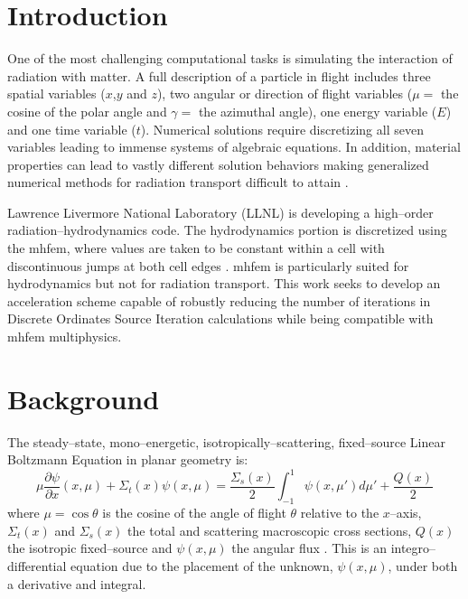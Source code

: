 \documentclass[11 pt]{article}
\newcommand{\pderiv}[2]{\frac{\partial #1}{\partial #2}}
\begin{document}



\section{Introduction}
	One of the most challenging computational tasks is simulating the interaction of radiation with matter. 
	A full description of a particle in flight includes three spatial variables ($x$,$y$ and $z$), two angular or direction of flight variables ($\mu =$ the cosine of the polar angle and $\gamma =$ the azimuthal angle), one energy variable ($E$) and one time variable ($t$). Numerical solutions require discretizing all seven variables leading to immense systems of algebraic equations. In addition, material properties can lead to vastly different solution behaviors making generalized numerical methods for radiation transport difficult to attain \cite{adams}. 



	Lawrence Livermore National Laboratory (LLNL) is developing a high--order radiation--hydrodynamics code. The hydrodynamics portion is discretized using the \gls{mhfem}, where values are taken to be constant within a cell with discontinuous jumps at both cell edges \cite{mhfem}. \gls{mhfem} is particularly suited for hydrodynamics but not for radiation transport. This work seeks to develop an acceleration scheme capable of robustly reducing the number of iterations in Discrete Ordinates Source Iteration calculations while being compatible with \gls{mhfem} multiphysics.   

\section{Background}
	The steady--state, mono--energetic, isotropically--scattering, fixed--source Linear Boltzmann Equation in planar geometry is: 
		\begin{equation} \label{eq:bte}
			\mu \pderiv{\psi}{x}(x, \mu) + \Sigma_t(x) \psi(x,\mu) = 
			\frac{\Sigma_s(x)}{2} \int_{-1}^{1} \psi(x, \mu') d\mu' + \frac{Q(x)}{2}
		\end{equation}
	where $\mu = \cos\theta$ is the cosine of the angle of flight $\theta$ relative to the $x$--axis, $\Sigma_t(x)$ and $\Sigma_s(x)$ the total and scattering macroscopic cross sections, $Q(x)$ the isotropic fixed--source and $\psi(x, \mu)$ the angular flux \cite{adams}. This is an integro--differential equation due to the placement of the unknown, $\psi(x,\mu)$, under both a derivative and integral.
\end{document}
